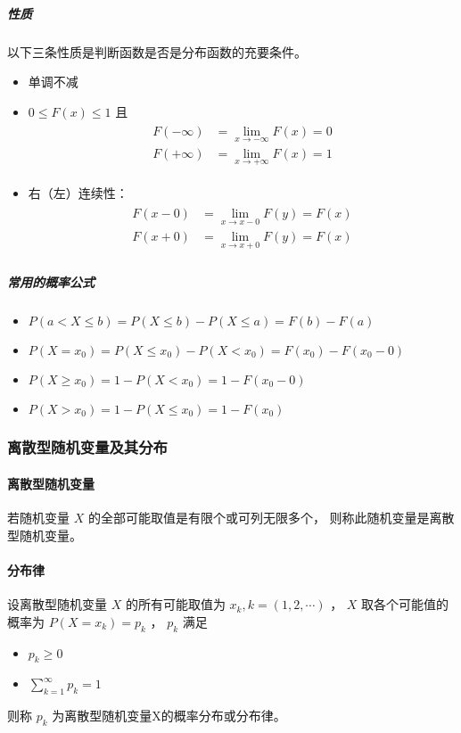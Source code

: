 \subparagraph{性质} 以下三条性质是判断函数是否是分布函数的充要条件。
\begin{itemize}[leftmargin=\subparitemindent]
    \item 单调不减
    \item  $ 0 \leqslant F(x) \leqslant 1 $ 且 \begin{align}
        \begin{split}
            F(-\infty) &= \lim_{x \rightarrow -\infty} F(x) = 0 \\
            F(+\infty) &= \lim_{x \rightarrow +\infty} F(x) = 1
        \end{split}
    \end{align}
    \item 右（左）连续性：\begin{align}
        \begin{split}
            F(x - 0) &= \lim_{x \rightarrow x - 0} F(y) = F(x) \\
            F(x + 0) &= \lim_{x \rightarrow x + 0} F(y) = F(x)
        \end{split}
    \end{align}
\end{itemize}

\subparagraph{常用的概率公式}
\begin{itemize}[leftmargin=\subparitemindent]
    \item  $ P(a < X \leqslant b) = P(X \leqslant b) - P(X \leqslant a) = F(b) - F(a) $ 
    \item  $ P(X = x_0) = P(X \leqslant x_0) - P(X < x_0) = F(x_0) - F(x_0 - 0) $ 
    \item  $ P(X \geqslant x_0) = 1 - P(X < x_0) = 1 - F(x_0 - 0) $ 
    \item  $ P(X > x_0) = 1 - P(X \leqslant x_0) = 1 - F(x_0) $ 
\end{itemize}

\subsubsection{离散型随机变量及其分布}

\paragraph{离散型随机变量} 若随机变量 $ X $ 的全部可能取值是有限个或可列无限多个，
则称此随机变量是离散型随机变量。

\paragraph{分布律} 设离散型随机变量 $ X $ 的所有可能取值为 $ x_k,k=(1,2,\cdots) $ ，
 $ X $ 取各个可能值的概率为 $ P(X = x_k) = p_k $ ， $ p_k $ 满足
\begin{itemize}[leftmargin=\paritemindent]
    \item  $ p_k \geqslant 0 $ 
    \item  $ \sum_{k=1}^\infty p_k = 1 $ 
\end{itemize}
则称 $ p_k $ 为离散型随机变量X的概率分布或分布律。

